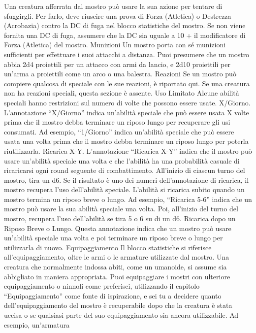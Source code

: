\begin{multicols}{2}
Una creatura afferrata dal mostro può usare la sua azione per
tentare di sfuggirgli. Per farlo, deve riuscire una prova di Forza
(Atletica) o Destrezza (Acrobazia) contro la DC di fuga nel
blocco statistiche del mostro. Se non viene fornita una DC di
fuga, assumere che la DC sia uguale a 10 + il modificatore di
Forza (Atletica) del mostro.
Munizioni
Un mostro porta con sé munizioni sufficienti per
effettuare i suoi attacchi a distanza. Puoi presumere
che un mostro abbia 2d4 proiettili per un attacco con
armi da lancio, e 2d10 proiettili per un’arma a proiettili
come un arco o una balestra.
Reazioni
Se un mostro può compiere qualcosa di speciale con le
sue reazioni, è riportato qui. Se una creatura non ha
reazioni speciali, questa sezione è assente.
Uso Limitato
Alcune abilità speciali hanno restrizioni sul numero di
volte che possono essere usate.
X/Giorno. L’annotazione “X/Giorno” indica un’abilità
speciale che può essere usata X volte prima che il
mostro debba terminare un riposo lungo per recuperare
gli usi consumati. Ad esempio, “1/Giorno” indica
un’abilità speciale che può essere usata una volta
prima che il mostro debba terminare un riposo lungo
per poterla riutilizzarla.
Ricarica X-Y. L’annotazione “Ricarica X-Y” indica che il
mostro può usare un’abilità speciale una volta e che
l’abilità ha una probabilità casuale di ricaricarsi ogni round
seguente di combattimento. All’inizio di ciascun turno del
mostro, tira un d6. Se il risultato è uno dei numeri
dell’annotazione di ricarica, il mostro recupera l’uso
dell’abilità speciale. L’abilità si ricarica subito quando un
mostro termina un riposo breve o lungo.
Ad esempio, “Ricarica 5-6” indica che un mostro può
usare la sua abilità speciale una volta. Poi, all’inizio del
turno del mostro, recupera l’uso dell’abilità se tira 5 o 6 su
di un d6.
Ricarica dopo un Riposo Breve o Lungo. Questa
annotazione indica che un mostro può usare un’abilità
speciale una volta e poi terminare un riposo breve o
lungo per utilizzarla di nuovo.
Equipaggiamento
Il blocco statistiche si riferisce all’equipaggiamento,
oltre le armi o le armature utilizzate dal mostro. Una
creatura che normalmente indossa abiti, come un
umanoide, si assume sia abbigliato in maniera
appropriata.
Puoi equipaggiare i mostri con ulteriore
equipaggiamento o ninnoli come preferisci, utilizzando il
capitolo “Equipaggiamento” come fonte di ispirazione, e
sei tu a decidere quanto dell’equipaggiamento del
mostro è recuperabile dopo che la creatura è stata
uccisa o se qualsiasi parte del suo equipaggiamento sia
ancora utilizzabile. Ad esempio, un’armatura 
 

\end{multicols}
